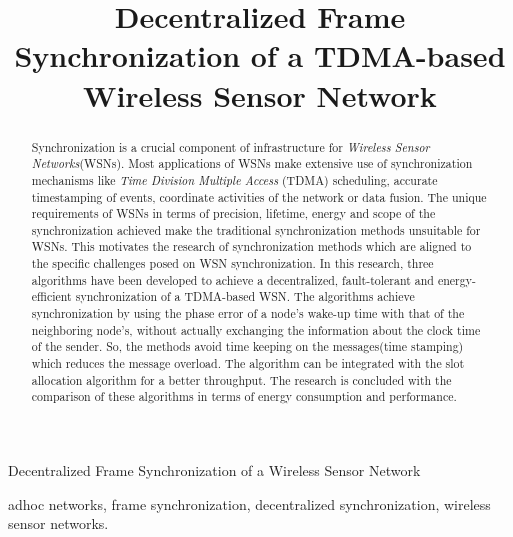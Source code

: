 \documentclass[journal]{IEEEtran}
\begin{document}
\title{Decentralized Frame Synchronization of a TDMA-based Wireless Sensor Network}
\author{\IEEEauthorblockN{}
}

{Decentralized Frame Synchronization of a Wireless Sensor Network}

\maketitle

\begin{abstract}
Synchronization is a crucial component of infrastructure for
\textit{Wireless Sensor Networks}(WSNs). Most applications of WSNs
make extensive use of synchronization mechanisms like  \emph{Time
Division Multiple Access} (TDMA) scheduling, accurate timestamping
of events, coordinate activities of the network or data fusion. The
unique requirements of WSNs in terms of precision, lifetime, energy
and scope of the synchronization achieved make the traditional
synchronization methods unsuitable for WSNs. This motivates the
research of synchronization methods which are aligned to the
specific challenges posed on WSN synchronization. \newline In this
research, three algorithms have been developed to achieve a
decentralized, fault-tolerant and energy-efficient synchronization
of a TDMA-based WSN. The algorithms achieve synchronization by using
the phase error of a node's wake-up time with that of the
neighboring node's, without actually exchanging the information
about the clock time of the sender. So, the methods avoid time
keeping on the messages(time stamping) which reduces the message
overload. The algorithm can be integrated with the slot allocation
algorithm  for a better throughput. The research is concluded with
the comparison of these algorithms in terms of energy consumption
and performance.
\end{abstract}
\begin{IEEEkeywords}
adhoc networks, frame synchronization, decentralized synchronization, wireless sensor networks.
\end{IEEEkeywords}
\end{document}
